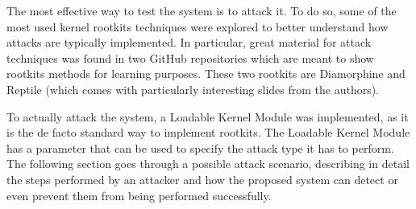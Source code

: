 The most effective way to test the system is to attack it. To do so, some of the most used kernel rootkits techniques were explored to better understand how attacks are typically implemented. In particular, great material for attack techniques was found in two GitHub repositories which are meant to show rootkits methods for learning purposes. These two rootkits are Diamorphine \cite{diamorph} and Reptile \cite{reptile} (which comes with particularly interesting slides \cite{rootkit-techniques} from the authors). 
\par 
To actually attack the system, a Loadable Kernel Module was implemented, as it is the de facto standard way to implement rootkits. The Loadable Kernel Module has a parameter that can be used to specify the attack type it has to perform.  The following section goes through a possible attack scenario, describing in detail the steps performed by an attacker and how the proposed system can detect or even prevent them from being performed successfully.

